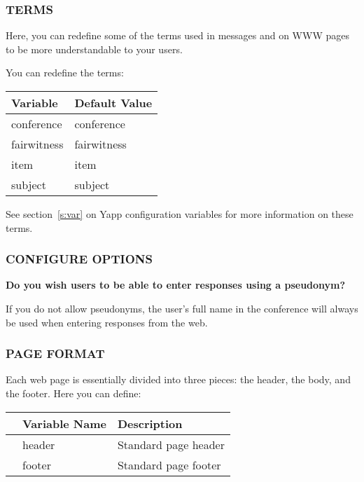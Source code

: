 \documentclass[twoside]{report}
\begin{document}
      \subsubsection*{TERMS}
       
         Here, you can redefine some of the terms used in messages and on 
         WWW pages to be more understandable to your users.

         You can redefine the terms:
         \vspace{12pt}

         \begin{tabular}{ll}
            Variable    & Default Value\\ \hline
            conference\index{conference}   &   conference\\
            fairwitness\index{fairwitness} &   fairwitness\\
            item\index{item}               &   item\\
            subject\index{subject}         &   subject\\ \hline
         \end{tabular}

         \vspace{12pt}
         See section~\ref{s:var} on Yapp configuration variables for more 
         information on these terms.

      \subsubsection*{CONFIGURE OPTIONS}

         {\bf Do you wish users to be able to enter responses using a 
          pseudonym? }
         \par
         If you do not allow pseudonyms, the user's full name in the conference
         will always be used when entering responses from the web.

      \subsubsection*{PAGE FORMAT}

         Each web page is essentially divided into three pieces: the header,
         the body, and the footer.  Here you can define:
         \vspace{12pt}

         \begin{tabular}{lll}
            & Variable Name & Description \\ \hline
            & header\index{header} & Standard page header \\
            & footer\index{footer} & Standard page footer \\ \hline
         \end {tabular}
\end{document}

